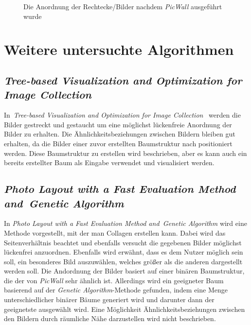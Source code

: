 \documentclass[12pt, ngerman, utf8]{article}
\begin{document}
\begin{figure}[h]
\begin{minipage}{.45\textwidth}
  \caption{Die Anordnung der Rechtecke/Bilder nachdem \textit{PicWall} ausgeführt wurde}
  \label{fig:picwall-vis}
\end{minipage}
\end{figure}

\section{Weitere untersuchte Algorithmen}\label{sec:weiter-algs}

\subsection{\emph{Tree-based Visualization and Optimization for Image Collection}}
In \emph{Tree-based Visualization and Optimization for Image Collection} \cite{treebased-vis} werden die Bilder gestreckt und gestaucht um eine möglichst lückenfreie Anordnung der Bilder zu erhalten. Die Ähnlichkeitsbeziehungen zwischen Bildern bleiben gut erhalten, da die Bilder einer zuvor erstellten Baumstruktur nach positioniert werden. Diese Baumstruktur zu erstellen wird beschrieben, aber es kann auch ein bereits erstellter Baum als Eingabe verwendet und visualisiert werden.

\subsection{\emph{Photo Layout with a Fast Evaluation Method and Genetic Algorithm}}
In \emph{Photo Layout with a Fast Evaluation Method and Genetic Algorithm} \cite{photo-layout} wird eine Methode vorgestellt, mit der man Collagen erstellen kann. Dabei wird das Seitenverhältnis beachtet und ebenfalls versucht die gegebenen Bilder möglichst lückenfrei anzuordnen. Ebenfalls wird erwähnt, dass es dem Nutzer möglich sein soll, ein besonderes Bild auszuwählen, welches größer als die anderen dargestellt werden soll. Die Andordnung der Bilder basiert auf einer binären Baumstruktur, die der von \textit{PicWall} sehr ähnlich ist. Allerdings wird ein geeigneter Baum basierend auf der \emph{Genetic Algorithm}-Methode gefunden, indem eine Menge unterschiedlicher binärer Bäume generiert wird und darunter dann der geeignetste ausgewählt wird. Eine Möglichkeit Ähn\-lich\-keits\-be\-zieh\-ung\-en zwischen den Bildern durch räumliche Nähe darzustellen wird nicht beschrieben.

\nocite{*}
\end{document}
